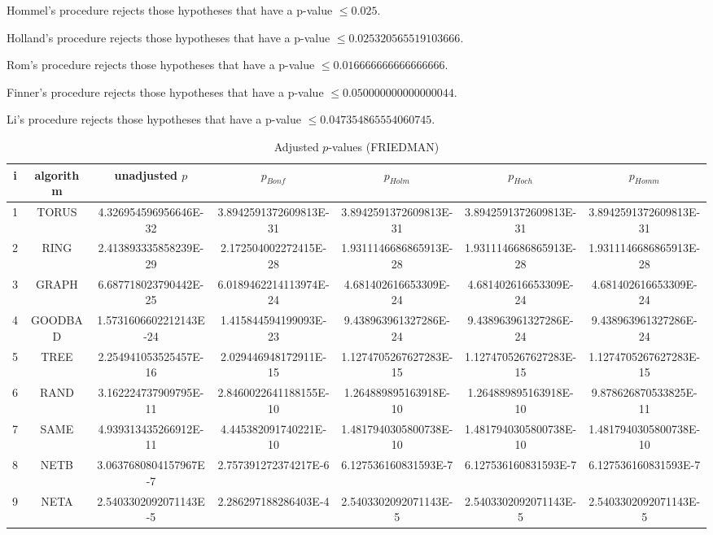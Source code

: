 \documentclass[a4paper,10pt]{article}
\begin{document}
\begin{landscape}
Hommel's procedure rejects those hypotheses that have a p-value $\le0.025$.


Holland's procedure rejects those hypotheses that have a p-value $\le0.025320565519103666$.


Rom's procedure rejects those hypotheses that have a p-value $\le0.016666666666666666$.


Finner's procedure rejects those hypotheses that have a p-value $\le0.050000000000000044$.


Li's procedure rejects those hypotheses that have a p-value $\le0.047354865554060745$.



\newpage

\begin{table}[!htp]
\centering\scriptsize
\caption{Adjusted $p$-values (FRIEDMAN)}
\begin{tabular}{ccccccc}
i&algorithm&unadjusted $p$&$p_{Bonf}$&$p_{Holm}$&$p_{Hoch}$&$p_{Homm}$\\
\hline
1& TORUS&4.326954596956646E-32&3.8942591372609813E-31&3.8942591372609813E-31&3.8942591372609813E-31&3.8942591372609813E-31\\
2& RING&2.413893335858239E-29&2.172504002272415E-28&1.9311146686865913E-28&1.9311146686865913E-28&1.9311146686865913E-28\\
3& GRAPH&6.687718023790442E-25&6.0189462214113974E-24&4.681402616653309E-24&4.681402616653309E-24&4.681402616653309E-24\\
4& GOODBAD&1.5731606602212143E-24&1.415844594199093E-23&9.438963961327286E-24&9.438963961327286E-24&9.438963961327286E-24\\
5& TREE&2.254941053525457E-16&2.029446948172911E-15&1.1274705267627283E-15&1.1274705267627283E-15&1.1274705267627283E-15\\
6& RAND&3.162224737909795E-11&2.8460022641188155E-10&1.264889895163918E-10&1.264889895163918E-10&9.878626870533825E-11\\
7& SAME&4.939313435266912E-11&4.445382091740221E-10&1.4817940305800738E-10&1.4817940305800738E-10&1.4817940305800738E-10\\
8& NETB&3.0637680804157967E-7&2.757391272374217E-6&6.127536160831593E-7&6.127536160831593E-7&6.127536160831593E-7\\
9& NETA&2.5403302092071143E-5&2.286297188286403E-4&2.5403302092071143E-5&2.5403302092071143E-5&2.5403302092071143E-5\\
\hline
\end{tabular}
\end{table}


\end{landscape}
\end{document}
